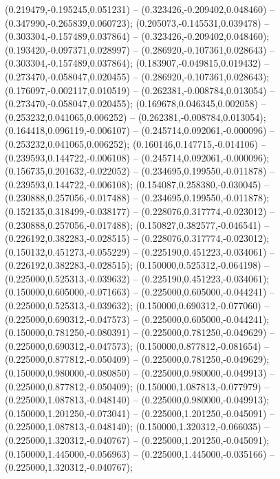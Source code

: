  (0.219479,-0.195245,0.051231) -- (0.323426,-0.209402,0.048460) -- (0.347990,-0.265839,0.060723);
 (0.205073,-0.145531,0.039478) -- (0.303304,-0.157489,0.037864) -- (0.323426,-0.209402,0.048460);
 (0.193420,-0.097371,0.028997) -- (0.286920,-0.107361,0.028643) -- (0.303304,-0.157489,0.037864);
 (0.183907,-0.049815,0.019432) -- (0.273470,-0.058047,0.020455) -- (0.286920,-0.107361,0.028643);
 (0.176097,-0.002117,0.010519) -- (0.262381,-0.008784,0.013054) -- (0.273470,-0.058047,0.020455);
 (0.169678,0.046345,0.002058) -- (0.253232,0.041065,0.006252) -- (0.262381,-0.008784,0.013054);
 (0.164418,0.096119,-0.006107) -- (0.245714,0.092061,-0.000096) -- (0.253232,0.041065,0.006252);
 (0.160146,0.147715,-0.014106) -- (0.239593,0.144722,-0.006108) -- (0.245714,0.092061,-0.000096);
 (0.156735,0.201632,-0.022052) -- (0.234695,0.199550,-0.011878) -- (0.239593,0.144722,-0.006108);
 (0.154087,0.258380,-0.030045) -- (0.230888,0.257056,-0.017488) -- (0.234695,0.199550,-0.011878);
 (0.152135,0.318499,-0.038177) -- (0.228076,0.317774,-0.023012) -- (0.230888,0.257056,-0.017488);
 (0.150827,0.382577,-0.046541) -- (0.226192,0.382283,-0.028515) -- (0.228076,0.317774,-0.023012);
 (0.150132,0.451273,-0.055229) -- (0.225190,0.451223,-0.034061) -- (0.226192,0.382283,-0.028515);
 (0.150000,0.525312,-0.064198) -- (0.225000,0.525313,-0.039632) -- (0.225190,0.451223,-0.034061);
 (0.150000,0.605000,-0.071663) -- (0.225000,0.605000,-0.044241) -- (0.225000,0.525313,-0.039632);
 (0.150000,0.690312,-0.077060) -- (0.225000,0.690312,-0.047573) -- (0.225000,0.605000,-0.044241);
 (0.150000,0.781250,-0.080391) -- (0.225000,0.781250,-0.049629) -- (0.225000,0.690312,-0.047573);
 (0.150000,0.877812,-0.081654) -- (0.225000,0.877812,-0.050409) -- (0.225000,0.781250,-0.049629);
 (0.150000,0.980000,-0.080850) -- (0.225000,0.980000,-0.049913) -- (0.225000,0.877812,-0.050409);
 (0.150000,1.087813,-0.077979) -- (0.225000,1.087813,-0.048140) -- (0.225000,0.980000,-0.049913);
 (0.150000,1.201250,-0.073041) -- (0.225000,1.201250,-0.045091) -- (0.225000,1.087813,-0.048140);
 (0.150000,1.320312,-0.066035) -- (0.225000,1.320312,-0.040767) -- (0.225000,1.201250,-0.045091);
 (0.150000,1.445000,-0.056963) -- (0.225000,1.445000,-0.035166) -- (0.225000,1.320312,-0.040767);
